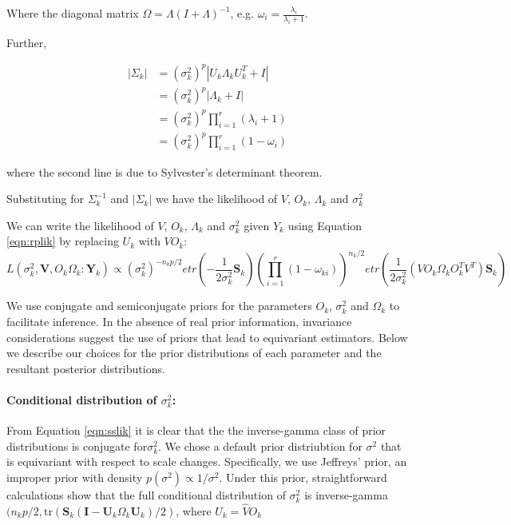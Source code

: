 \documentclass{article}
\newcommand{\bl}[1]{{\mathbf #1}}
\newcommand{\tr}{\text{tr}}
\begin{document}
Where the diagonal matrix $\Omega = \Lambda(I+\Lambda)^{-1}$, e.g. $\omega_i = \frac{\lambda_i}{\lambda_{i}+1}$.  

 Further, 

\begin{align}
|\Sigma_k| &= (\sigma_k^2)^{p}|U_k\Lambda_kU_k^T+I|\\
&= (\sigma_k^2)^{p}|\Lambda_k+I| \\
&= (\sigma_k^2)^{p}\prod_{i=1}^r(\lambda_i+1)\\
&= (\sigma_k^2)^{p}\prod_{i=1}^r(1-\omega_i)
\end{align}

where the second line is due to Sylvester's determinant theorem.

Substituting for $\Sigma^{-1}_k$ and $|\Sigma_k|$ we have the likelihood of $V$, $O_k$, $\Lambda_k$ and $\sigma_k^2$

We can write the likelihood of $V$, $O_k$, $\Lambda_k$ and
$\sigma_k^2$ given $Y_k$ using Equation \ref{eqn:rplik} by replacing
$U_k$ with $VO_k$: 
\begin{equation}
 L(\sigma_k^2,\bl V , O_k \Omega_k : \bl Y_k) \propto
    (\sigma_k^2)^{-n_kp/2}etr(-\frac{1}{2\sigma_k^2}\mathbf{S}_k)\left(\prod_{i=1}^r(1-\omega_{ki})
   \right) ^{n_k/2}
   etr(\frac{1}{2\sigma_k^2}(VO_k\Omega_kO_k^TV^T)\mathbf{S}_k)
\label{eqn:sslik}
\end{equation}

We use conjugate and semiconjugate priors for the parameters $O_k$,
$\sigma^2_k$ and $\Omega_k$ to facilitate inference.  In the absence
of real prior information, invariance considerations suggest the use
of priors that lead to equivariant estimators.  Below we describe our
choices for the prior distributions of each parameter and the
resultant posterior distributions.

\paragraph{Conditional distribution of $\sigma_k^2$:}

From Equation \ref{eqn:sslik} it is clear that the the inverse-gamma
class of prior distributions is conjugate for$\sigma_k^2$.  We chose a
default prior distriubtion for $\sigma^2$ that is equivariant with
respect to scale changes.  Specifically, we use Jeffreys' prior, an
improper prior with density $p(\sigma^2) \propto 1/\sigma^2 $.  Under
this prior, straightforward calculations show that the full
conditional distribution of $\sigma_k^2$ is
inverse-gamma$( n_k p/2 , \tr(\bl S_k(\bl I -\bl U_k\Omega_k\bl
U_k)/2)$, where $U_k = \hat{V}O_k$
\end{document}
